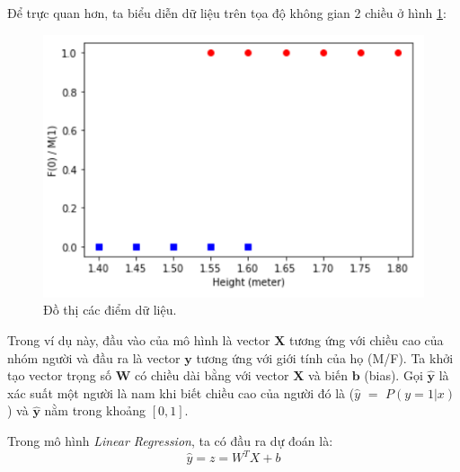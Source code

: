 Để trực quan hơn, ta biểu diễn dữ liệu trên tọa độ không gian 2 chiều ở hình \ref{fig:sec2ex1}:
\begin{figure}[!ht]
    \centering
    \includegraphics[scale=0.5]{books/artificial-neural-network/chapter02/figure/example1.png}
    \caption{Đồ thị các điểm dữ liệu.}
    \label{fig:sec2ex1}
\end{figure}

Trong ví dụ này, đầu vào của mô hình là vector $\mathbf{X}$ tương ứng với chiều cao của nhóm người và đầu ra là vector $\mathbf{y}$ tương ứng với giới tính của họ (M/F). Ta khởi tạo vector trọng số $\mathbf{W}$ có chiều dài bằng với vector $\mathbf{X}$ và biến $\mathbf{b}$ (bias). Gọi $\mathbf{\hat{y}}$ là xác suất một người là nam khi biết chiều cao của người đó là ($\hat{y}$ $=$ $P(y=1|x)$) và $\mathbf{\hat{y}}$ nằm trong khoảng $[0, 1]$.


Trong mô hình \textit{Linear Regression}, ta có đầu ra dự đoán là:
\begin{equation*}
    \hat{y} = z = W^TX + b
\end{equation*}

